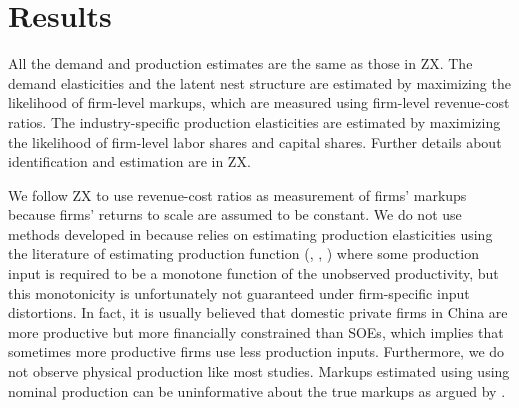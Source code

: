 \documentclass[12pt]{article}
\begin{document}

\section{Results} 
\label{sec:ch3results}
All the demand and production estimates are the same as those in ZX. The demand elasticities and the latent nest structure are estimated by maximizing the likelihood of firm-level markups, which are measured using firm-level revenue-cost ratios. The industry-specific production elasticities are estimated by maximizing the likelihood of firm-level labor shares and capital shares. Further details about identification and estimation are in ZX.

We follow ZX to use revenue-cost ratios as measurement of firms' markups because firms' returns to scale are assumed to be constant. We do not use methods developed in \citet{loeckerMarkupsFirmLevelExport2012} because \citet{loeckerMarkupsFirmLevelExport2012} relies on estimating production elasticities using the literature of estimating production function (\citet{olleyDynamicsProductivityTelecommunications1996}, \citet{levinsohnEstimatingProductionFunctions2003}, \citet{ackerberg_identification_2015}) where some production input is required to be a monotone function of the unobserved productivity, but this monotonicity is unfortunately not guaranteed under firm-specific input distortions. In fact, it is usually believed that domestic private firms in China are more productive but more financially constrained than SOEs, which implies that sometimes more productive firms use less production inputs. Furthermore, we do not observe physical production like most studies. Markups estimated using \citet{loeckerMarkupsFirmLevelExport2012} using nominal production can be uninformative about the true markups as argued by \citet{bond_unpleasant_2021}.
\end{document}
